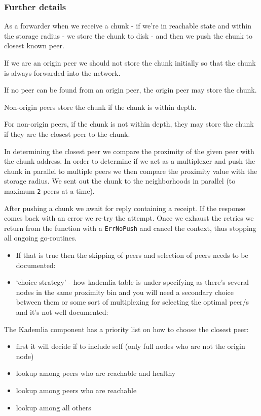 \subsubsection{Further details}\label{further-details}

As a forwarder when we receive a chunk - if we're in reachable state and
within the storage radius - we store the chunk to disk - and then we
push the chunk to closest known peer.

If we are an origin peer we should not store the chunk initially so that
the chunk is always forwarded into the network.

If no peer can be found from an origin peer, the origin peer may store
the chunk.

Non-origin peers store the chunk if the chunk is within depth.

For non-origin peers, if the chunk is not within depth, they may store
the chunk if they are the closest peer to the chunk.

In determining the closest peer we compare the proximity of the given
peer with the chunk address. In order to determine if we act as a
multiplexer and push the chunk in parallel to multiple peers we then
compare the proximity value with the storage radius. We sent out the
chunk to the neighborhoods in parallel (to maximum \texttt{2} peers at a
time).

After pushing a chunk we await for reply containing a receipt. If the
response comes back with an error we re-try the attempt. Once we exhaust
the retries we return from the function with a \texttt{ErrNoPush} and
cancel the context, thus stopping all ongoing go-routines.
\begin{itemize}
\tightlist
\item If that is true then the skipping of peers and selection of peers needs to be documented:
\item `choice strategy' - how kademlia table is under specifying as there's several nodes in the same proximity bin and you will need a secondary choice between them or some sort of multiplexing for selecting the optimal peer/s and it's not well documented:
\end{itemize}

The Kademlia component has a priority list on how to choose the closest
peer:
\begin{itemize}
\tightlist
\item first it will decide if to include self (only full nodes who are not the origin node)
\item lookup among peers who are reachable and healthy
\item lookup among peers who are reachable
\item lookup among all others
\end{itemize}

